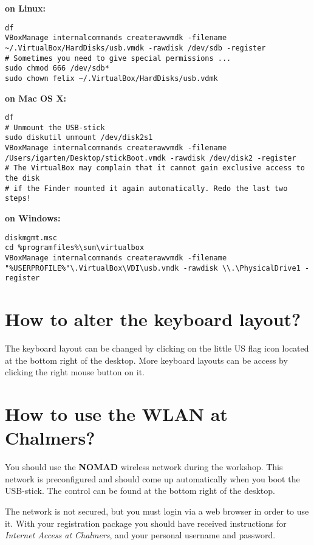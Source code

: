 \documentclass[11pt,a4paper,twocolumn]{article}
\begin{document}
\begin{htmlonly}

{\bf on Linux:}
\begin{verbatim}
df
VBoxManage internalcommands createrawvmdk -filename ~/.VirtualBox/HardDisks/usb.vmdk -rawdisk /dev/sdb -register
# Sometimes you need to give special permissions ...
sudo chmod 666 /dev/sdb*
sudo chown felix ~/.VirtualBox/HardDisks/usb.vdmk
\end{verbatim}

{\bf on Mac OS X:}
\begin{verbatim}
df
# Unmount the USB-stick
sudo diskutil unmount /dev/disk2s1
VBoxManage internalcommands createrawvmdk -filename /Users/igarten/Desktop/stickBoot.vmdk -rawdisk /dev/disk2 -register
# The VirtualBox may complain that it cannot gain exclusive access to the disk 
# if the Finder mounted it again automatically. Redo the last two steps!
\end{verbatim}

{\bf on Windows:}
\begin{verbatim}
diskmgmt.msc
cd %programfiles%\sun\virtualbox
VBoxManage internalcommands createrawvmdk -filename "%USERPROFILE%"\.VirtualBox\VDI\usb.vmdk -rawdisk \\.\PhysicalDrive1 -register
\end{verbatim}

\end{htmlonly}

\section{How to alter the keyboard layout?}

The keyboard layout can be changed by clicking on the little US flag icon
located at the bottom right of the desktop. More keyboard layouts can be access
by clicking the right mouse button on it.

\section{How to use the WLAN at Chalmers?}

You should use the {\bf NOMAD} wireless network during the workshop. This network
is preconfigured and should come up automatically when you boot the USB-stick. The
control can be found at the bottom right of the desktop.

The network is not secured, but you must login via a web browser in order to use
it.  With your registration package you should have received instructions for
\emph{Internet Access at Chalmers}, and your personal username and password.
\end{document}

